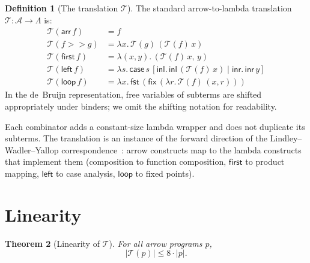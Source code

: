 \documentclass[11pt,a4paper]{article}
\newtheorem{theorem}{Theorem}
\theoremstyle{definition}
\newtheorem{definition}[theorem]{Definition}
\theoremstyle{remark}
\newcommand{\arr}{\mathsf{arr}}
\newcommand{\comp}{\mathbin{>\!\!>}}
\newcommand{\first}{\mathsf{first}}
\newcommand{\leftc}{\mathsf{left}}
\newcommand{\loopop}{\mathsf{loop}}
\newcommand{\fix}{\mathsf{fix}}
\newcommand{\T}{\mathcal{T}}
\newcommand{\lamterm}{\Lambda}
\newcommand{\arrowprog}{\mathcal{A}}
\newcommand{\size}[1]{\lvert #1 \rvert}
\begin{document}
\begin{definition}[The translation $\T$]\label{def:T}
The standard arrow-to-lambda translation
$\T : \arrowprog \to \lamterm$ is:
\begin{align}
  \T(\arr\,f) &= f \label{eq:t-arr} \\
  \T(f \comp g) &= \lambda x.\, \T(g)\,(\T(f)\,x) \label{eq:t-comp} \\
  \T(\first\,f) &= \lambda(x, y).\, (\T(f)\,x,\, y) \label{eq:t-first} \\
  \T(\leftc\,f) &= \lambda s.\, \mathsf{case}\,s\,
    [\mathsf{inl}.\, \mathsf{inl}\,(\T(f)\,x) \mid \mathsf{inr}.\, \mathsf{inr}\,y]
    \label{eq:t-left} \\
  \T(\loopop\,f) &= \lambda x.\, \mathsf{fst}\,(\fix\,(\lambda r.\, \T(f)\,(x, r)))
    \label{eq:t-loop}
\end{align}
In the de~Bruijn representation, free variables of subterms are shifted
appropriately under binders; we omit the shifting notation for readability.
\end{definition}

Each combinator adds a constant-size lambda wrapper and does not duplicate
its subterms. The translation is an instance of the forward direction of
the Lindley--Wadler--Yallop correspondence~\cite{lindley2008arrow}: arrow
constructs map to the lambda constructs that implement them (composition to
function composition, $\first$ to product mapping, $\leftc$ to case
analysis, $\loopop$ to fixed points).

\section{Linearity}\label{sec:linearity}

\begin{theorem}[Linearity of $\T$]\label{thm:linear}
For all arrow programs $p$,
\[
  \size{\T(p)} \leq 8 \cdot \size{p}.
\]
\end{theorem}
\end{document}
